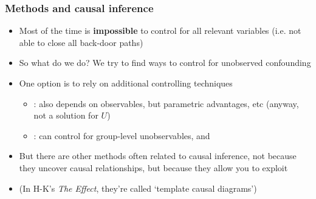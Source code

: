 \documentclass[aspectratio=43]{beamer}
\begin{document}
\begin{frame}
\frametitle{Methods and causal inference}
\centering

\begin{itemize}
  \item Most of the time is \textbf{impossible} to control for all relevant variables (i.e. not able to close all back-door paths)
  \item So what do we do? We try to find ways to control for unobserved confounding
  \item One option is to rely on additional controlling techniques
  \begin{itemize}
    \item {}: also depends on observables, but parametric advantages, etc (anyway, not a solution for $U$)
    \item {}: can control for group-level unobservables, and 
  \end{itemize}



  \item But there are other methods often related to causal inference, not because they uncover causal relationships, but because they allow you to exploit 
  \item {\small (In H-K's \textit{The Effect}, they're called `template causal diagrams')}
\end{itemize}

\end{frame}
\end{document}
